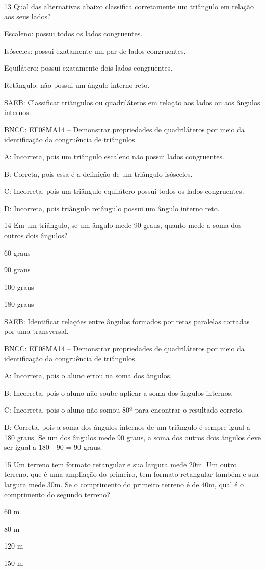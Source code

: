 {\num{13} Qual das alternativas abaixo classifica corretamente um triângulo em
relação aos seus lados?
\item Escaleno: possui todos os lados congruentes.
\item Isósceles: possui exatamente um par de lados congruentes.
\item Equilátero: possui exatamente dois lados congruentes.
\item Retângulo: não possui um ângulo interno reto.

SAEB: Classificar triângulos ou quadriláteros em relação aos lados ou
aos ângulos internos.

BNCC: EF08MA14 -- Demonstrar propriedades de quadriláteros por meio da
identificação da congruência de triângulos.

A: Incorreta, pois um triângulo escaleno não possui lados congruentes.

B: Correta, pois essa é a definição de um triângulo isósceles.

C: Incorreta, pois um triângulo equilátero possui todos os lados
congruentes.

D: Incorreta, pois triângulo retângulo possui um ângulo interno reto.

\num{14} Em um triângulo, se um ângulo mede 90 graus, quanto mede a soma dos
outros dois ângulos?
\item 60 graus
\item 90 graus
\item 100 graus
\item 180 graus

SAEB: Identificar relações entre ângulos formados por retas paralelas
cortadas por uma transversal.

BNCC: EF08MA14 -- Demonstrar propriedades de quadriláteros por meio da
identificação da congruência de triângulos.

A: Incorreta, pois o aluno errou na soma dos ângulos.

B: Incorreta, pois o aluno não soube aplicar a soma dos ângulos
internos.

C: Incorreta, pois o aluno não somou 80º para encontrar o resultado
correto.

D: Correta, pois a soma dos ângulos internos de um triângulo é sempre
igual a 180 graus. Se um dos ângulos mede 90 graus, a soma dos outros
dois ângulos deve ser igual a 180 - 90 = 90 graus.

\num{15} Um terreno tem formato retangular e sua largura mede 20m. Um outro
terreno, que é uma ampliação do primeiro, tem formato retangular também
e sua largura mede 30m. Se o comprimento do primeiro terreno é de 40m,
qual é o comprimento do segundo terreno?
\item 60 m
\item 80 m
\item 120 m
\item 150 m

}
